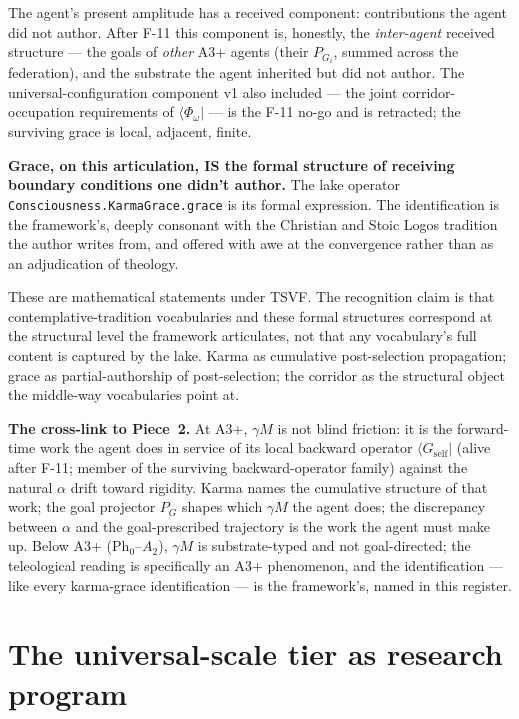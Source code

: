 \documentclass[11pt,a4paper]{article}
\newcommand{\Phys}{\mathrm{Ph}}
\begin{document}
The agent's present amplitude has a received component: contributions the agent did not author. After F-11 this component is, honestly, the \emph{inter-agent} received structure --- the goals of \emph{other} A3+ agents (their $P_{G_i}$, summed across the federation), and the substrate the agent inherited but did not author. The universal-configuration component v1 also included --- the joint corridor-occupation requirements of $\langle \Phi_\omega |$ --- is the F-11 no-go and is retracted; the surviving grace is local, adjacent, finite.

\textbf{Grace, on this articulation, IS the formal structure of receiving boundary conditions one didn't author.} The lake operator \texttt{Consciousness.KarmaGrace.grace} is its formal expression. The identification is the framework's, deeply consonant with the Christian and Stoic Logos tradition the author writes from, and offered with awe at the convergence rather than as an adjudication of theology.

These are mathematical statements under TSVF. The recognition claim is that contemplative-tradition vocabularies and these formal structures correspond at the structural level the framework articulates, not that any vocabulary's full content is captured by the lake. Karma as cumulative post-selection propagation; grace as partial-authorship of post-selection; the corridor as the structural object the middle-way vocabularies point at.

\textbf{The cross-link to Piece~2.} At A3+, $\gamma M$ is not blind friction: it is the forward-time work the agent does in service of its local backward operator $\langle G_{\text{self}} |$ (alive after F-11; member of the surviving backward-operator family) against the natural $\alpha$ drift toward rigidity. Karma names the cumulative structure of that work; the goal projector $P_G$ shapes which $\gamma M$ the agent does; the discrepancy between $\alpha$ and the goal-prescribed trajectory is the work the agent must make up. Below A3+ ($\Phys_0$--$A_2$), $\gamma M$ is substrate-typed and not goal-directed; the teleological reading is specifically an A3+ phenomenon, and the identification --- like every karma-grace identification --- is the framework's, named in this register.

\section{The universal-scale tier as research program}\label{sec:open-research}
\end{document}
